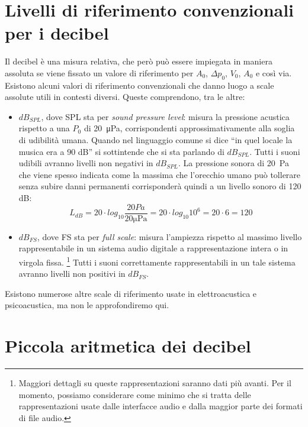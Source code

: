 \documentclass[11pt]{report}
\begin{document}
\section{Livelli di riferimento convenzionali per i decibel}

Il decibel è una misura relativa, che però può essere impiegata in maniera assoluta se viene fissato un valore di riferimento per $A_0$, $\Delta p_0$, $V_0$, $A_0$ e così via. Esistono alcuni valori di riferimento convenzionali che danno luogo a scale assolute utili in contesti diversi. Queste comprendono, tra le altre:

\begin{itemize}

\item{$dB_{SPL}$}, dove SPL sta per \emph{sound pressure level}: misura la pressione acustica rispetto a una $P_0$ di \qty{20}{\micro\pascal}, corrispondenti approssimativamente alla soglia di udibilità umana. Quando nel linguaggio comune si dice ``in quel locale la musica era a 90 dB'' si sottintende che si sta parlando di $dB_{SPL}$. Tutti i suoni udibili avranno livelli non negativi in $dB_{SPL}$. La pressione sonora di \qty{20}{\pascal} che viene spesso indicata come la massima che l'orecchio umano può tollerare senza subire danni permanenti corrisponderà quindi a un livello sonoro di 120 dB:
\begin{equation}
L_{dB} = 20 \cdot log_{10}\frac{20 \unit{Pa}}{20 \unit{\micro\pascal}} = 20 \cdot log_{10}10^6 = 20 \cdot 6 = 120
\end{equation}

\item{$dB_{FS}$}, dove FS sta per \emph{full scale}: misura l'ampiezza rispetto al massimo livello rappresentabile in un sistema audio digitale a rappresentazione intera o in virgola fissa.%
\footnote{Maggiori dettagli su queste rappresentazioni saranno dati più avanti. Per il momento, possiamo considerare come minimo che si tratta delle rappresentazioni usate dalle interfacce audio e dalla maggior parte dei formati di file audio.}
Tutti i suoni correttamente rappresentabili in un tale sistema avranno livelli non positivi in $dB_{FS}$.

\end{itemize}

Esistono numerose altre scale di riferimento usate in elettroacustica e psicoacustica, ma non le approfondiremo qui.




\section{Piccola aritmetica dei decibel}
\end{document}
